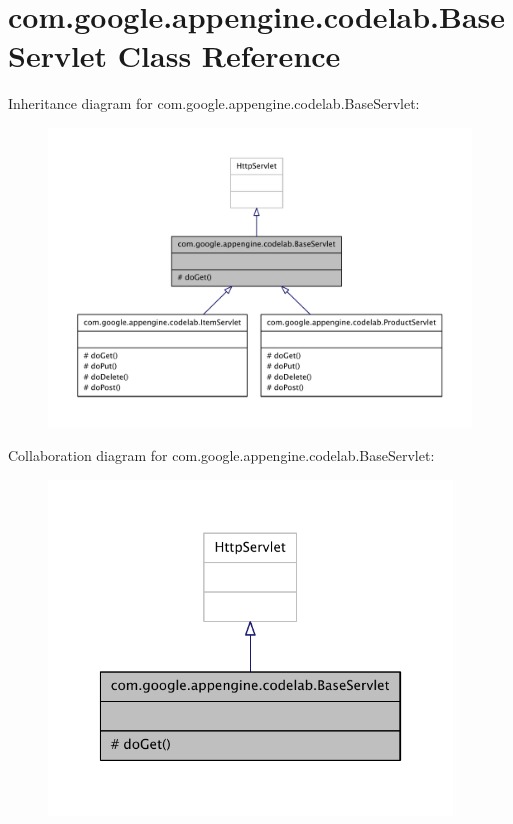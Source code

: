 \hypertarget{classcom_1_1google_1_1appengine_1_1codelab_1_1_base_servlet}{\section{com.\-google.\-appengine.\-codelab.\-Base\-Servlet Class Reference}
\label{classcom_1_1google_1_1appengine_1_1codelab_1_1_base_servlet}
}


Inheritance diagram for com.\-google.\-appengine.\-codelab.\-Base\-Servlet\-:
\nopagebreak
\begin{figure}[H]
\begin{center}
\leavevmode
\includegraphics[width=350pt]{classcom_1_1google_1_1appengine_1_1codelab_1_1_base_servlet__inherit__graph}
\end{center}
\end{figure}


Collaboration diagram for com.\-google.\-appengine.\-codelab.\-Base\-Servlet\-:
\nopagebreak
\begin{figure}[H]
\begin{center}
\leavevmode
\includegraphics[width=304pt]{classcom_1_1google_1_1appengine_1_1codelab_1_1_base_servlet__coll__graph}
\end{center}
\end{figure}
